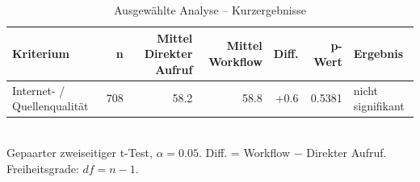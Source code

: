 \begin{table}[htbp]
\centering
\caption{Ausgewählte Analyse -- Kurzergebnisse}
\begin{tabular}{lrrrrrl}
\toprule
Kriterium & n & Mittel Direkter Aufruf & Mittel Workflow & Diff. & p-Wert & Ergebnis \\
\midrule
Internet- / Quellenqualität & 708 & 58.2 & 58.8 & +0.6 & 0.5381 & nicht signifikant \\
\bottomrule
\end{tabular}
\\[2mm]
\footnotesize Gepaarter zweiseitiger t-Test, $\alpha=0.05$. Diff. = Workflow $-$ Direkter Aufruf. Freiheitsgrade: $df=n-1$.
\end{table}
